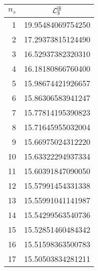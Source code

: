 \begin{tabular}[t]{rc}
\toprule
  $n_{s}$ &  $\mathcal L^{\boxplus}_3$ \\ \toprule
\midrule
        1 &                   19.95484069754250 \\
        2 &                   17.29373815124490 \\
        3 &                   16.52937382320310 \\
        4 &                   16.18180866760400 \\
        5 &                   15.98674421926657 \\
        6 &                   15.86306583941247 \\
        7 &                   15.77814195390823 \\
        8 &                   15.71645955032004 \\
        9 &                   15.66975024312220 \\
       10 &                   15.63322294937334 \\
       11 &                   15.60391847090050 \\
       12 &                   15.57991454331338 \\
       13 &                   15.55991041141987 \\
       14 &                   15.54299563540736 \\
       15 &                   15.52851460484342 \\
       16 &                   15.51598363500783 \\
       17 &                   15.50503834281211 \\
\bottomrule
\end{tabular}
\hspace{2em}
